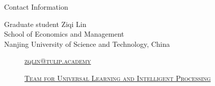 \documentclass[
size=14pt,
paper=smartboard,  %
mode=present, 		%
display=slides, 	%
style=tuliplab,  	%
pauseslide,
fleqn,leqno]{powerdot}
\begin{document}
	\begin{wideslide}[toc=,bm=]{Contact Information}
		\centering
		\twocolumn[
		lcolwidth=0.35\linewidth,
		rcolwidth=0.65\linewidth
		]
		{
		}
		{
			Graduate student  Ziqi Lin\\
			School of Economics and Management\\
			Nanjing University of Science and Technology, China
			\begin{description}
				\item[\textcolor{orange}{\faEnvelope}] \href{mailto:jluo@tulip.org.au}
				{\textsc{\footnotesize{zqlin@tulip.academy}}}
				
				\item[\textcolor{orange}{\faHome}] \href{http://www.tulip.org.au}
				{\textsc{\footnotesize{Team for Universal Learning and Intelligent Processing}}}
			\end{description}
		}
	\end{wideslide}
	
\end{document}
